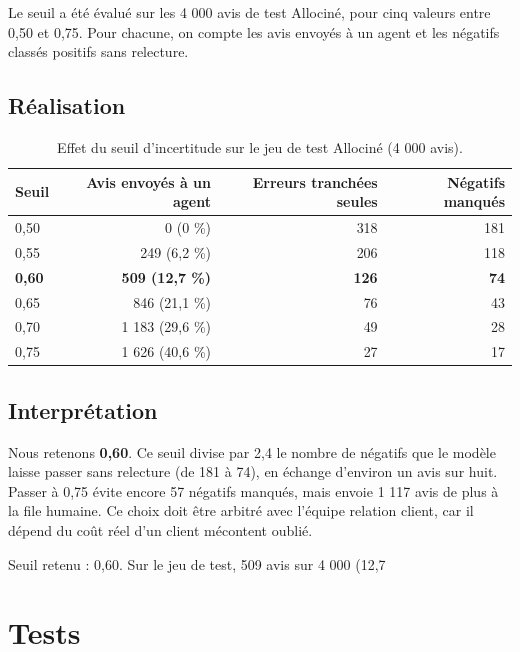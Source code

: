 \documentclass[11pt,a4paper]{article}
\begin{document}
Le seuil a été évalué sur les 4 000 avis de test Allociné, pour cinq valeurs entre 0,50 et 0,75. Pour chacune, on compte les avis envoyés à un agent et les négatifs classés positifs sans relecture.

\subsection{Réalisation}

\begin{table}[H]
\centering
\begin{tabular}{lrrr}
\toprule
\textbf{Seuil} & \textbf{Avis envoyés à un agent} & \textbf{Erreurs tranchées seules} & \textbf{Négatifs manqués} \\
\midrule
0,50 & 0 (0 \%) & 318 & 181 \\
0,55 & 249 (6,2 \%) & 206 & 118 \\
\textbf{0,60} & \textbf{509 (12,7 \%)} & \textbf{126} & \textbf{74} \\
0,65 & 846 (21,1 \%) & 76 & 43 \\
0,70 & 1 183 (29,6 \%) & 49 & 28 \\
0,75 & 1 626 (40,6 \%) & 27 & 17 \\
\bottomrule
\end{tabular}
\caption{Effet du seuil d'incertitude sur le jeu de test Allociné (4 000 avis).}
\end{table}

\subsection{Interprétation}

Nous retenons \textbf{0,60}. Ce seuil divise par 2,4 le nombre de négatifs que le modèle laisse passer sans relecture (de 181 à 74), en échange d'environ un avis sur huit. Passer à 0,75 évite encore 57 négatifs manqués, mais envoie 1 117 avis de plus à la file humaine. Ce choix doit être arbitré avec l'équipe relation client, car il dépend du coût réel d'un client mécontent oublié.

\begin{reponse}
Seuil retenu : 0,60. Sur le jeu de test, 509 avis sur 4 000 (12,7 %
\end{reponse}

\section{Tests}
\end{document}
